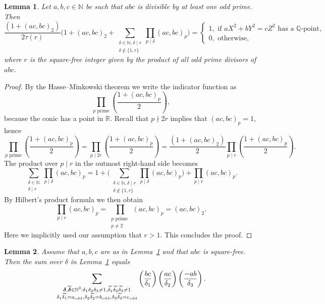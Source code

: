 \documentclass[a4paper,12pt,reqno]{amsart}
\numberwithin{equation}{section} \numberwithin{figure}{section}
\newcommand\N{\mathbb{N}}
\newcommand\R{\mathbb{R}}
\newcommand\QQ{\mathbb{Q}}
\renewcommand{\l}{\left}
\renewcommand{\r}{\right}
\renewcommand{\#}{\sharp}
\newtheorem{lemma}{Lemma}
\theoremstyle{definition}
\numberwithin{lemma}{section}
\begin{document}
 \begin{lemma}\label{lem:predamnlabel} Let  
$a,b,c \in \N$  be such that $abc$ is divisible by at least one odd prime.
Then  
\[ \frac{\l( 1+(ac,bc)_2\r) }{2 \tau(r) } \bigg(1+(ac,bc)_2+\sum_{\substack{\delta \in \N, \delta \mid r  \\  \delta\notin \{1,r\}} } 
\prod_{p\mid \delta } (ac,bc)_p 
\bigg)= \begin{cases} 1, \text{ if } aX^2+bY^2=cZ^2  \text{ has a }\QQ\text{-point},\\ 0, \text{ otherwise,} \end{cases}
  \] where  $r$ is the square-free integer given by  the product of all odd prime divisors of $abc$. 
 \end{lemma}
\begin{proof}By  the Hasse--Minkowski theorem we write the indicator function as 
\[ \prod_{p \text{ prime}} \l( \frac{1+ (ac,bc )_p }{2}\r) ,\] because the conic has a point in $\R$. Recall  that $p\nmid 2r$ implies that $ (ac,bc )_p=1$, hence
\[ \prod_{p \text{ prime}} \l( \frac{1+ (ac,bc )_p }{2}\r) =\prod_{p \mid 2 r } \l( \frac{1+ (ac,bc )_p }{2}\r) =
 \frac{(1+ (ac,bc )_2) }{2} \prod_{p \mid   r } \l( \frac{1+ (ac,bc )_p }{2}\r) .\] 
The product over $p\mid r $ in the outmost right-hand side  becomes 
 \[  \sum_{\substack{ \delta\in \N  \\ \delta \mid r }}\prod_{p\mid \delta }  (ac,bc)_p = 
1+
 \bigg( \sum_{\substack{ \delta\in \N,   \delta \mid r\\ \delta \notin\{ 1 , r\} } } \prod_{p\mid \delta }  (ac,bc)_p \bigg)
+  \prod_{p\mid r  }  (ac,bc)_p .\] By Hilbert's product formula we then obtain  
$$\prod_{p\mid r }  (ac,bc)_p=\prod_{\substack{ p \textrm{ prime } \\ p\neq 2 }} (ac,bc)_p=(ac,bc)_2.$$ 
Here we implicitly used our assumption that $r>1$. This concludes the proof. 
\end{proof}
  \begin{lemma}\label{lem:abmdbvl55} 
Assume that $a,b,c$ are as in Lemma~\ref{lem:predamnlabel} and that $abc$ is square-free. 
Then the sum over $\delta $ in Lemma~\ref{lem:predamnlabel} equals \[
\sum_{\substack{\boldsymbol  \delta , \widetilde {\boldsymbol \delta} \in \N^3:
\delta_1  \delta_2\delta_3 \neq 1, 
\widetilde {\delta_1}\widetilde {\delta_2}\widetilde {\delta_3}\neq 1 
 \\ \delta_1\widetilde {\delta_1}= a_{\rm{odd}}, \delta_2\widetilde {\delta_2}=b_{\rm{odd}}, \delta_3 \widetilde {\delta_3}= c_{\rm{odd}}} } 
\left(\frac{bc}{\delta_1}\right)  \left(\frac{ac}{\delta_2}\right) \left(\frac{-ab}{\delta_3}\right).\] \end{lemma}
\end{document}
